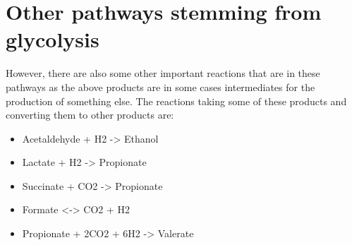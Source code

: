 \documentclass[11pt]{article}
\begin{document}
\section{Other pathways stemming from glycolysis}
\label{sec:orgd205f67}
However, there are also some other important reactions that are in these pathways as the above products are in some cases intermediates for the production of something else. The reactions taking some of these products and converting them to other products are: 

\begin{itemize}
\item Acetaldehyde + H2 -> Ethanol
\item Lactate + H2 -> Propionate
\item Succinate + CO2 -> Propionate
\item Formate <-> CO2 + H2
\item Propionate + 2CO2 + 6H2 -> Valerate
\end{itemize}
\end{document}
